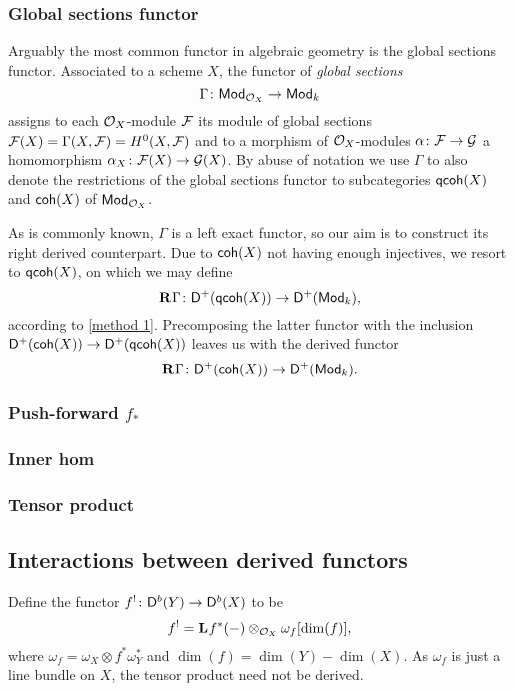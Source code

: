\subsubsection{Global sections functor}
Arguably the most common functor in algebraic geometry is the global sections functor. Associated to a scheme $X$, the functor of \emph{global sections}
\[
    \Gamma \colon \mathsf{Mod}_{\mathcal O_X} \to \mathsf{Mod}_{k}
\]
assigns to each $\mathcal O_X$-module $\mathcal F$ its module of global sections $\mathcal F(X) = \Gamma(X, \mathcal F) = H^0(X, \mathcal F)$ and to a morphism of $\mathcal O_X$-modules $\alpha\colon \mathcal F \to \mathcal G$ a homomorphism $\alpha_X \colon \mathcal F(X) \to \mathcal G(X)$.
By abuse of notation we use $\Gamma$ to also denote the restrictions of the global sections functor to subcategories $\mathsf{qcoh}(X)$ and $\mathsf{coh}(X)$ of $\mathsf{Mod}_{\mathcal O_X}$.

As is commonly known, $\Gamma$ is a left exact functor, so our aim is to construct its right derived counterpart. Due to $\mathsf{coh}(X)$ not having enough injectives, we resort to $\mathsf{qcoh}(X)$, on which we may define 
\[
    \mathbf{R}^{}\Gamma\colon \mathsf{D}^+(\mathsf{qcoh}(X)) \to \mathsf{D}^+(\mathsf{Mod}_{k}),
\]
according to \ref{method 1}. Precomposing the latter functor with the inclusion $\mathsf{D}^+(\mathsf{coh}(X)) \to \mathsf{D}^+(\mathsf{qcoh}(X))$ leaves us with the derived functor
\[
    \mathbf{R}^{}\Gamma \colon \mathsf{D}^+(\mathsf{coh}(X)) \to \mathsf{D}^+(\mathsf{Mod}_{k}).
\]







\subsubsection{Push-forward $f_*$}
\subsubsection{Inner hom}
\subsubsection{Tensor product }

\subsection{Interactions between derived functors}


Define the functor $f^! \colon \mathsf{D}^b(Y) \to \mathsf{D}^b(X)$ to be
\[
    f^! = \mathbf{L}^{}f^*(-) \otimes_{{\mathcal{O}_{X}}} \omega_f[\dim(f)],
\]
where $\omega_f = \omega_X \otimes f^*\omega_Y^*$ and $\dim(f) = \dim(Y) - \dim(X)$. As $\omega_f$ is just a line bundle on $X$, the tensor product need not be derived. 

